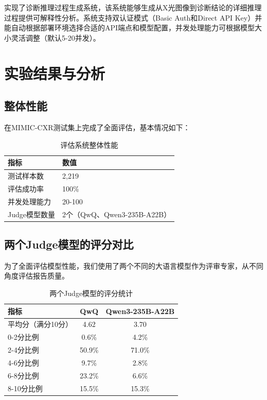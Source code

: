 \documentclass[12pt,a4paper]{article}
\begin{document}
实现了诊断推理过程生成系统，该系统能够生成从X光图像到诊断结论的详细推理过程提供可解释性分析。系统支持双认证模式（Basic Auth和Direct API Key）并能自动根据部署环境选择合适的API端点和模型配置，并发处理能力可根据模型大小灵活调整（默认5-20并发）。

\section{实验结果与分析}

\subsection{整体性能}

在MIMIC-CXR测试集上完成了全面评估，基本情况如下：

\begin{table}[h]
\centering
\begin{tabular}{ll}
\toprule
\textbf{指标} & \textbf{数值} \\
\midrule
测试样本数 & 2,219 \\
评估成功率 & 100\% \\
并发处理能力 & 20-100 \\
Judge模型数量 & 2个（QwQ、Qwen3-235B-A22B） \\
\bottomrule
\end{tabular}
\caption{评估系统整体性能}
\end{table}

\subsection{两个Judge模型的评分对比}

为了全面评估模型性能，我们使用了两个不同的大语言模型作为评审专家，从不同角度评估报告质量。

\begin{table}[h]
\centering
\begin{tabular}{lcc}
\toprule
\textbf{指标} & \textbf{QwQ} & \textbf{Qwen3-235B-A22B} \\
\midrule
平均分（满分10分） & 4.62 & 3.70 \\
0-2分比例 & 0.6\% & 4.2\% \\
2-4分比例 & 50.9\% & 71.0\% \\
4-6分比例 & 9.7\% & 2.8\% \\
6-8分比例 & 23.2\% & 6.6\% \\
8-10分比例 & 15.5\% & 15.3\% \\
\bottomrule
\end{tabular}
\caption{两个Judge模型的评分统计}
\end{table}
\end{document}
